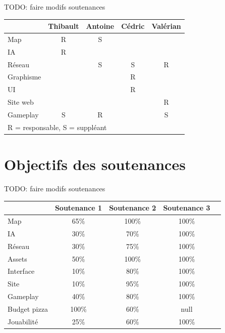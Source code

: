 \documentclass[12pt]{report}
\begin{document}
TODO: faire modifs soutenances

\begin{center}
    \begin{tabular}{@{} l *4c @{}}
        \toprule
        \multicolumn{1}{c}{}    & \textbf{Thibault}  & \textbf{Antoine}  & \textbf{Cédric} & \textbf{Valérian} \\ 
        \midrule
        Map & R & S & & \\
        IA & R & & & \\
        Réseau & & S & S & R \\
        Graphisme & & & R & \\
        UI & & & R & \\
        Site web & & & & R \\
        Gameplay & S & R & & S\\
        \bottomrule
        \multicolumn{4}{l}{\footnotesize R = responsable, S = suppléant}\\
    \end{tabular}
\end{center}


\section{Objectifs des soutenances}

TODO: faire modifs soutenances

\begin{center}
    \begin{tabular}{@{} l *4c @{}}
        \toprule
        \multicolumn{1}{c}{}    & \textbf{Soutenance 1}  & \textbf{Soutenance 2}  & \textbf{Soutenance 3} \\ 
        \midrule
        Map & 65\% & 100\% & 100\% \\
        IA & 30\% & 70\% & 100\% \\
        Réseau & 30\% & 75\% & 100\% \\
        Assets & 50\% & 100\% & 100\% \\
        Interface & 10\% & 80\% & 100\% \\
        Site & 10\% & 95\% & 100\% \\
        Gameplay & 40\% & 80\% & 100\% \\
        Budget pizza & 100\% & 60\% & null\\
        \midrule
        Jouabilité & 25\% & 60\% & 100\% \\
        \bottomrule
    \end{tabular}
\end{center}
\end{document}
